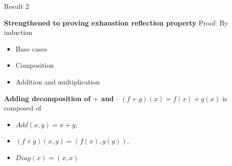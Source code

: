 \begin{frame}{Result 2 }
\begin{minipage}[t]{0.44\linewidth}
\begin{exampleblock}{\textbf{\textcolor{BrickRed}{Strengthened to proving \textbf{exhaustion reflection property}}}}
            \pause
            Proof: By induction 
            \vspace{-0.5em}
            \begin{itemize}
                \setlength\itemsep{-5pt}
                \pause\item Base cases \Checkmark
                \pause\item Composition \Checkmark 
                \pause \item Addition and multiplication \textcolor{Mahogany}{\XSolidBrush}
            \end{itemize}
        \end{exampleblock}
        \vspace{-1em} \pause
        \begin{exampleblock}{\textbf{\textcolor{OliveGreen}{Adding decomposition of $+$ and $\cdot$}}}
        \vspace{-0.5em}
        $(f+g)(x) = f(x)+g(x)$ is composed of
        \vspace{-0.4em}
        \begin{itemize}
            \setlength\itemsep{-2pt}
            \item $\mathit{Add}(x,y) = x + y$,
            \item $(f\times g)(x,y) = (f(x),g(y))$, 
            \item $\mathit{Diag}(x) = (x,x) \qquad$ 
        \end{itemize}
        \end{exampleblock}
    \end{minipage}
    \note[itemize]{
}
\end{frame}
